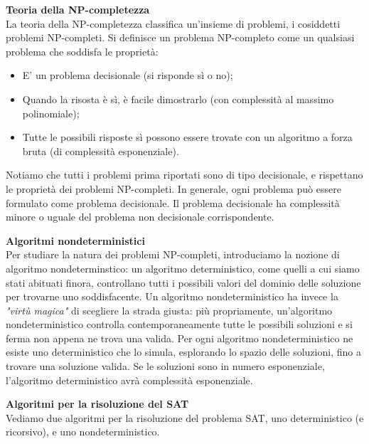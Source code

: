 \documentclass[a4paper,12pt]{article}
\begin{document}
\par\smallskip
\textbf{Teoria della NP-completezza} \\
La teoria della NP-completezza classifica un'insieme di problemi, i cosiddetti problemi NP-completi. Si definisce un problema NP-completo come un
qualsiasi problema che soddisfa le proprietà:
\begin{itemize}
  \item E' un problema decisionale (si risponde sì o no);
  \item Quando la risosta è sì, è facile dimostrarlo (con complessità al massimo polinomiale);
  \item Tutte le possibili risposte sì possono essere trovate con un algoritmo a forza bruta (di complessità esponenziale).
\end{itemize}
Notiamo che tutti i problemi prima riportati sono di tipo decisionale, e rispettano le proprietà dei problemi NP-completi.
In generale, ogni problema può essere formulato come problema decisionale. Il problema decisionale ha complessità minore o uguale del
problema non decisionale corrispondente.
\par\smallskip
\textbf{Algoritmi nondeterministici} \\
Per studiare la natura dei problemi NP-completi, introduciamo la nozione di algoritmo nondeterminstico: un algoritmo deterministico, come quelli
a cui siamo stati abituati finora, controllano tutti i possibili valori del dominio delle soluzione per trovarne uno soddisfacente. Un algoritmo nondeterministico
ha invece la \textit{"virtù magica"} di scegliere la strada giusta: più propriamente, un'algoritmo nondeterministico controlla contemporaneamente tutte le possibili
soluzioni e si ferma non appena ne trova una valida. 
Per ogni algoritmo nondeterministico ne esiste uno deterministico che lo simula, esplorando lo spazio delle soluzioni, fino a trovare una soluzione valida.
Se le soluzioni sono in numero esponenziale, l'algoritmo deterministico avrà complessità esponenziale.
\par\smallskip
\textbf{Algoritmi per la risoluzione del SAT} \\
Vediamo due algoritmi per la risoluzione del problema SAT, uno deterministico (e ricorsivo), e uno nondeterministico.
\end{document}
